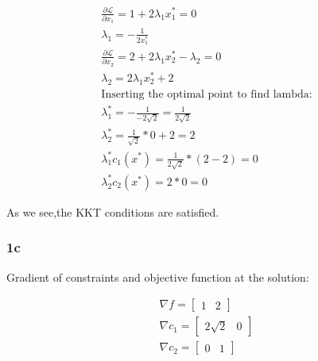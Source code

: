 \begin{subequations}
    \begin{align}
        \frac{\partial \mathcal{L}}{\partial x_1} = 1+2\lambda_1 x_1^* = 0\\ 
        \lambda_1 = -\frac{1}{2x_1^*} \\ 
        \frac{\partial \mathcal{L}}{\partial x_2} = 2 + 2\lambda_1 x_2^* - \lambda_2 = 0 \\ 
        \lambda_2 = 2\lambda_1 x_2^* + 2 \\ 
        \text{Inserting the optimal point to find lambda:} \\ 
        \lambda_1^* = -\frac{1}{-2\sqrt2} = \frac{1}{2\sqrt2} \\ 
        \lambda_2^* = \frac{1}{\sqrt2}*0+2 = 2 \\ 
        \lambda_1^* c_1(x^*) = \frac{1}{2\sqrt2} * (2-2) = 0 \\ 
        \lambda_2^* c_2(x^*) = 2*0 = 0
    \end{align}
\end{subequations}

As we see,the KKT conditions are satisfied.



\subsubsection{1c}
Gradient of constraints and objective function at the solution:

\begin{subequations}
    \begin{align}
        \nabla f = \begin{bmatrix}
            1 & 2
        \end{bmatrix} \\ 
        \nabla c_1 = \begin{bmatrix}
            2\sqrt{2} & 0
        \end{bmatrix} \\ 
        \nabla c_2 = \begin{bmatrix}
            0 & 1
        \end{bmatrix}
    \end{align}
\end{subequations}

